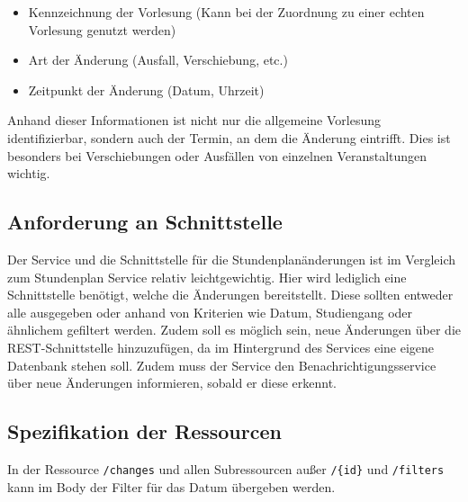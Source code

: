 \begin{itemize}

\item Kennzeichnung der Vorlesung (Kann bei der Zuordnung zu einer echten Vorlesung genutzt werden)

\item Art der Änderung (Ausfall, Verschiebung, etc.)

\item Zeitpunkt der Änderung (Datum, Uhrzeit)

\end{itemize}

Anhand dieser Informationen ist nicht nur die allgemeine Vorlesung identifizierbar, sondern auch der Termin, an dem die Änderung eintrifft. Dies ist besonders bei Verschiebungen oder Ausfällen von einzelnen Veranstaltungen wichtig.

\subsection*{Anforderung an Schnittstelle}
\label{sec:stundenplan_change_anforderung}

Der Service und die Schnittstelle für die Stundenplanänderungen ist im Vergleich zum Stundenplan Service relativ leichtgewichtig. Hier wird lediglich eine Schnittstelle benötigt, welche die Änderungen bereitstellt. Diese sollten entweder alle ausgegeben oder anhand von Kriterien wie Datum, Studiengang oder ähnlichem gefiltert werden. Zudem soll es möglich sein, neue Änderungen über die \ac{REST}-Schnitt\-stelle hinzuzufügen, da im Hintergrund des Services eine eigene Datenbank stehen soll. Zudem muss der Service den Benachrichtigungsservice über neue Änderungen informieren, sobald er diese erkennt. 

\subsection*{Spezifikation der Ressourcen}
\label{sec:stundenplan_change_api}
In der Ressource \lstinline[columns=fixed]{/changes} und allen Subressourcen außer \lstinline|/{id}| und \lstinline[columns=fixed]{/filters} kann im Body der Filter für das Datum übergeben werden.

